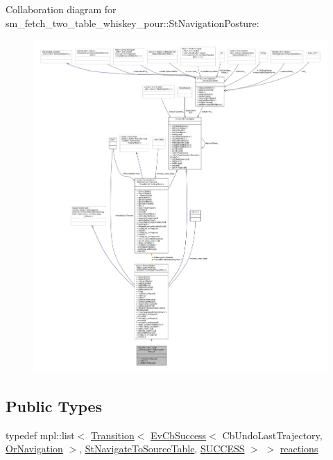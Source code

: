 Collaboration diagram for sm\+\_\+fetch\+\_\+two\+\_\+table\+\_\+whiskey\+\_\+pour\+:\+:St\+Navigation\+Posture\+:
\nopagebreak
\begin{figure}[H]
\begin{center}
\leavevmode
\includegraphics[width=350pt]{structsm__fetch__two__table__whiskey__pour_1_1StNavigationPosture__coll__graph}
\end{center}
\end{figure}
\subsection*{Public Types}
\begin{DoxyCompactItemize}
\item 
typedef mpl\+::list$<$ \hyperlink{classsmacc_1_1Transition}{Transition}$<$ \hyperlink{structsmacc_1_1EvCbSuccess}{Ev\+Cb\+Success}$<$ Cb\+Undo\+Last\+Trajectory, \hyperlink{classsm__fetch__two__table__whiskey__pour_1_1OrNavigation}{Or\+Navigation} $>$, \hyperlink{structsm__fetch__two__table__whiskey__pour_1_1StNavigateToSourceTable}{St\+Navigate\+To\+Source\+Table}, \hyperlink{structsmacc_1_1default__transition__tags_1_1SUCCESS}{S\+U\+C\+C\+E\+SS} $>$ $>$ \hyperlink{structsm__fetch__two__table__whiskey__pour_1_1StNavigationPosture_a1f23e9bd0f31c8af5842322c0d6931b1}{reactions}
\end{DoxyCompactItemize}
